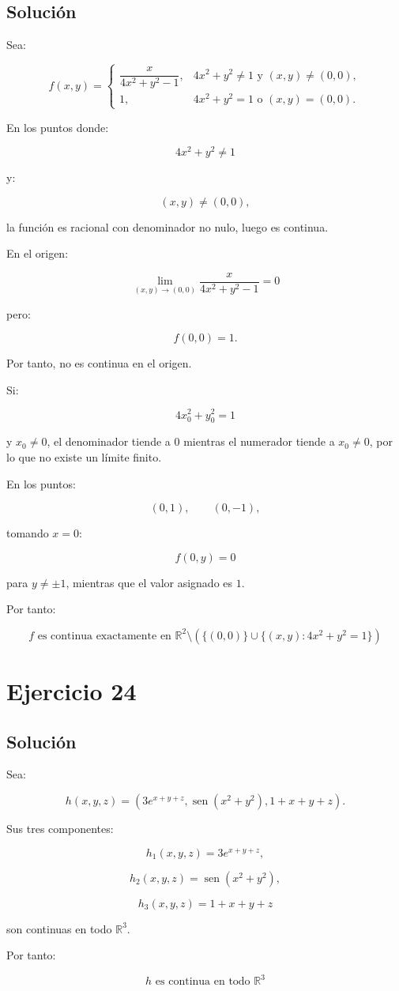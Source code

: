 \documentclass[11pt,a4paper]{article}
\newcommand{\R}{\mathbb{R}}
\newcommand{\sen}{\operatorname{sen}}
\begin{document}
\subsection{Solución}

Sea:

\[
f(x,y)
=
\begin{cases}
\dfrac{x}{4x^2+y^2-1},
&
4x^2+y^2\neq1
\text{ y }(x,y)\neq(0,0),\\[2mm]
1,
&
4x^2+y^2=1
\text{ o }(x,y)=(0,0).
\end{cases}
\]

En los puntos donde:

\[
4x^2+y^2\neq1
\]

y:

\[
(x,y)\neq(0,0),
\]

la función es racional con denominador no nulo, luego es continua.

En el origen:

\[
\lim_{(x,y)\to(0,0)}
\frac{x}{4x^2+y^2-1}
=
0
\]

pero:

\[
f(0,0)=1.
\]

Por tanto, no es continua en el origen.

Si:

\[
4x_0^2+y_0^2=1
\]

y \(x_0\neq0\), el denominador tiende a \(0\) mientras el numerador tiende a \(x_0\neq0\), por lo que no existe un límite finito.

En los puntos:

\[
(0,1),
\qquad
(0,-1),
\]

tomando \(x=0\):

\[
f(0,y)=0
\]

para \(y\neq\pm1\), mientras que el valor asignado es \(1\).

Por tanto:

\[
\boxed{
f\text{ es continua exactamente en }
\R^2
\setminus
\left(
\{(0,0)\}
\cup
\{(x,y):4x^2+y^2=1\}
\right)
}
\]

\section{Ejercicio 24}
\subsection{Solución}

Sea:

\[
h(x,y,z)
=
\left(
3e^{x+y+z},
\sen(x^2+y^2),
1+x+y+z
\right).
\]

Sus tres componentes:

\[
h_1(x,y,z)=3e^{x+y+z},
\]

\[
h_2(x,y,z)=\sen(x^2+y^2),
\]

\[
h_3(x,y,z)=1+x+y+z
\]

son continuas en todo \(\R^3\).

Por tanto:

\[
\boxed{
h\text{ es continua en todo }\R^3
}
\]
\end{document}
